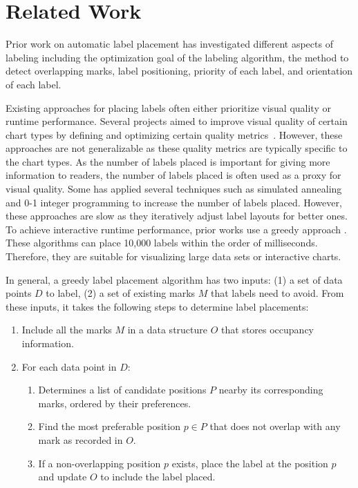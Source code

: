 \section{Related Work}

Prior work on automatic label placement has investigated different aspects of labeling including the optimization goal of the labeling algorithm, the method to detect overlapping marks, label positioning, priority of each label, and orientation of each label.

Existing approaches for placing labels often either prioritize visual quality %
or runtime performance.
Several projects aimed to improve visual quality of certain chart types by defining and optimizing certain quality metrics~\cite{ladislav:layout-aware, cmolik:ghost,timo:agent,kouril:level,wu:zone}.
However, these approaches are not generalizable as these quality metrics are typically specific 
to the chart types. 
As the number of labels placed is important for giving more information to readers,
the number of labels placed is often used as a proxy for visual quality. 
Some has applied several techniques such as simulated annealing \cite{zoraster:annealing} and
0-1 integer programming \cite{zoraster:int-program} to increase the number of labels placed.
However, these approaches are slow as they iteratively adjust label layouts for better ones.
To achieve interactive runtime performance, prior works use a greedy approach \cite{luboschik:particle, mote:informed-greedy}.
These algorithms can place 10,000 labels within the order of milliseconds.
Therefore, they are suitable for visualizing large data sets or interactive charts.

In general, a greedy label placement algorithm has two inputs:
(1) a set of data points $D$ to label,
(2) a set of existing marks $M$ that labels need to avoid.
From these inputs, it takes the following steps to determine label placements:
\begin{enumerate}
  \vspace{-5pt}
  \item Include all the marks $M$ in a data structure $O$ that stores occupancy information.
  \vspace{-5pt}
  \item For each data point in $D$:
  \vspace{-5pt}
  \begin{enumerate}
    \item Determines a list of candidate positions $P$ nearby its corresponding marks, ordered by their preferences.
    \vspace{-2.5pt}
    \item Find the most preferable position $p \in P$ that does not overlap with any mark as recorded in $O$.
    \vspace{-2.5pt}
    \item If a non-overlapping position $p$ exists, place the label at the position $p$ and update $O$ to include the label placed.
  \end{enumerate}
\end{enumerate}

